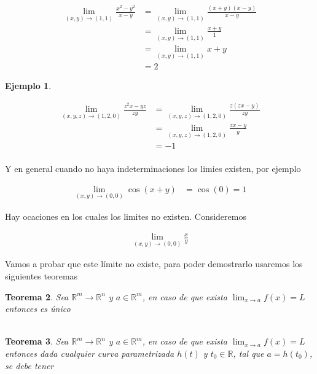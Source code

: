 \documentclass{article}
\theoremstyle{plain}
\newtheorem{thm}{Teorema}[section]
\theoremstyle{definition}
\newtheorem{ejem}[thm]{Ejemplo}
\begin{document}
\begin{align*}
\displaystyle \lim_{(x,y) \to (1,1)} \frac{x^2-y^2}{x-y} &= \lim_{(x,y) \to (1,1)} \frac{(x+y)(x-y)}{x-y} \\
&= \lim_{(x,y) \to (1,1)} \frac{x+y}{1} \\
&= \lim_{(x,y) \to (1,1)} x+y \\
&= 2
\end{align*}

\newpage


\begin{ejem}
\end{ejem}

\begin{align*}
\displaystyle \lim_{(x,y,z) \to (1,2,0)} \frac{z^2x-yz}{zy} &= \lim_{(x,y,z) \to (1,2,0)} \frac{z(zx-y)}{zy}\\
&= \lim_{(x,y,z) \to (1,2,0)} \frac{zx-y}{y}\\
&=  -1\\
\end{align*}



Y en general cuando no haya indeterminaciones los limies existen, por ejemplo




\begin{align*}
\displaystyle \lim_{(x,y) \to (0,0)} \cos(x+y)&= \cos(0) =1
\end{align*}



Hay ocaciones en los cuales los limites no existen. Consideremos

\begin{align*}
\displaystyle \lim_{(x,y) \to (0,0)}  \frac{x}{y}
\end{align*}

Vamos a probar que este l\'imite no existe, para poder demostrarlo usaremos los siguientes teoremas \\



\begin{thm}Sea $\mathbb{R}^m \to \mathbb{R}^n$ y $a \in \mathbb{R}^m$, en caso de que exista $\displaystyle \lim_{x \to a} f(x) = L$ entonces es único \\ \\
\end{thm}




\begin{thm}Sea $\mathbb{R}^m \to \mathbb{R}^n$ y $a \in \mathbb{R}^m$, en caso de que exista $\displaystyle \lim_{x \to a} f(x) = L$ entonces dada cualquier curva parametrizada $h(t)$ y $t_0 \in \mathbb{R}$, tal que $ a=h(t_0) $, se debe tener \\
\end{thm}
\end{document}
